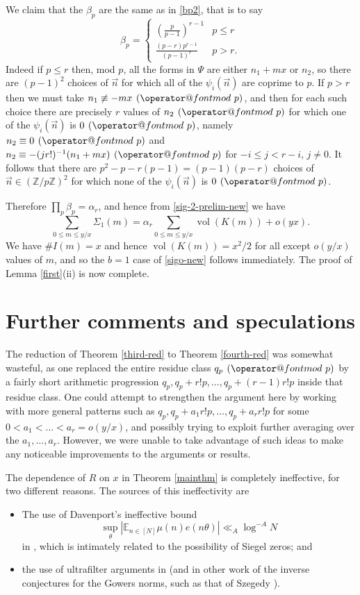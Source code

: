 \documentclass[11pt]{amsart}
\makeatletter
\numberwithin{equation}{section}  %
\theoremstyle{remark}
\theoremstyle{plain}
\numberwithin{equation}{section}
\newcommand{\Z}{\mathbb{Z}}
\newcommand{\E}{\mathbb{E}}  %
\renewcommand{\pmod}[1]{\allowbreak\mkern7mu({\operator@font mod}\,\,#1)}
\renewcommand{\leq}{\leqslant}
\renewcommand{\(}{\left(}
\renewcommand{\)}{\right)}
\newcommand{\vect}[1]{{\ensuremath{\vec{#1}}}}
\newcommand{\vol}{\operatorname{vol}}
\makeatother
\begin{document}
We claim that the $\beta_p$ are the same as in \eqref{bp2}, that is to say
\[ \beta_p = \left\{ \begin{array}{ll} (\frac{p}{p-1})^{r-1} & p \leq
  r \\ \frac{(p-r)p^{r-1}}{(p-1)^r} & p > r.\end{array}  \right. \]
Indeed if $p \leq r$ then, mod $p$, all the forms in $\Psi$ are either $n_1 + mx$ or $n_2$, so there are $(p-1)^2$ choices of $\vect{n}$ for which all of the $\psi_i(\vect{n})$ are coprime to $p$. If $p > r$ then we must take $n_1 \not\equiv -mx \pmod{p}$, and then for each such choice there are precisely $r$ values of $n_2 \pmod{p}$ for which one of the $\psi_i(\vect{n})$ is $0 \pmod{p}$, namely $n_2 \equiv 0\pmod{p}$ and $n_2 \equiv -(jr!)^{-1} (n_1 + mx) \pmod{p}$ for $-i \leq j < r-i$, $j \neq 0$. It follows that there are $p^2 - p - r(p-1) = (p-1)(p-r)$ choices of $\vect{n} \in (\Z/p\Z)^2$ for which none of the $\psi_i(\vect{n})$ is $0 \pmod{p}$.

Therefore $\prod_p \beta_p = \alpha_r$, and hence from \eqref{sig-2-prelim-new} we have
\[ \sum_{0 \leq m \leq y/x} \Sigma_1(m) = \alpha_r \sum_{0 \leq m \leq y/x} \vol(K(m)) + o(y x).\]
We have $\# I(m) = x$ and hence $\vol(K(m)) = x^2/2$ for all except $o(y/x)$ values of $m$, and so the $b=1$ case of \eqref{sigo-new} follows immediately.  The proof of Lemma \ref{first}(ii) is now complete.

\section{Further comments and speculations}

The reduction of Theorem \ref{third-red} to Theorem \ref{fourth-red} was somewhat wasteful, as one replaced the entire residue class $q_p \pmod{p}$ by a fairly short arithmetic progression $q_p, q_p+r!p,\dots, q_p+(r-1)r!p$ inside that residue class.  One could attempt to strengthen the argument here by working with more general patterns such as $q_p, q_p + a_1 r! p, \dots, q_p + a_r r! p$ for some $0 < a_1 < \dots < a_r = o(y/x)$, and possibly trying to exploit further averaging over the $a_1,\dots,a_r$.  However, we were unable to take advantage of such ideas to make any noticeable improvements to the arguments or results.

The dependence of $R$ on $x$ in Theorem \ref{mainthm} is completely ineffective, for two different reasons. The sources of this ineffectivity are
\begin{itemize}
\item The use of Davenport's ineffective bound
\[ \sup_{\theta} |\E_{n \in [N]} \mu(n) e(n \theta)| \ll_A \log^{-A} N\] in \cite{gt-nilmobius}, which is intimately related to the possibility of Siegel zeros; and
\item the use of ultrafilter arguments in \cite{GTZ} (and in other work of the inverse conjectures for the Gowers norms, such as that of Szegedy \cite{szegedy}).
\end{itemize}
\end{document}
